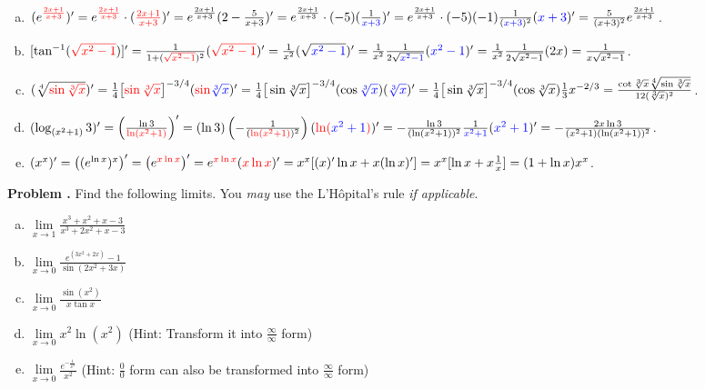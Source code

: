 \documentclass[11pt,letterpaper]{article}
\newcounter{problem}
\newcommand{\problem}{
	\stepcounter{problem}%
	\noindent \textbf{Problem \theproblem. }%
}
\begin{document}
\begin{enumerate}[(a)]
    \item $(e^{\textcolor{red}{\frac{2x+1}{x+3}}})' = e^{\textcolor{red}{\frac{2x+1}{x+3}}}\cdot(\textcolor{red}{\frac{2x+1}{x+3}})' = e^{\frac{2x+1}{x+3}}(2-\frac{5}{x+3})' = e^{\frac{2x+1}{x+3}}\cdot(-5)(\frac{1}{\textcolor{blue}{x+3}})' = e^{\frac{2x+1}{x+3}}\cdot(-5)(-1)\frac{1}{(\textcolor{blue}{x+3})^2}(\textcolor{blue}{x+3})' = \frac{5}{(x+3)^2}e^{\frac{2x+1}{x+3}}$.
    \item $[\tan^{-1}(\textcolor{red}{\sqrt{x^2-1}})]' = \frac{1}{1+(\textcolor{red}{\sqrt{x^2-1}})^2}(\textcolor{red}{\sqrt{x^2-1}})' = \frac{1}{x^2}(\sqrt{\textcolor{blue}{x^2-1}})' = \frac{1}{x^2}\frac{1}{2\sqrt{\textcolor{blue}{x^2-1}}}(\textcolor{blue}{x^2-1})' = \frac{1}{x^2}\frac{1}{2\sqrt{x^2-1}}(2x) = \frac{1}{x\sqrt{x^2-1}}$.
    \item $(\sqrt[4]{\textcolor{red}{\sin\sqrt[3]{x}}})'=\frac{1}{4}\big[\textcolor{red}{\sin\sqrt[3]{x}}\big]^{-3/4}(\textcolor{red}{\sin}\textcolor{blue}{\sqrt[3]{x}})' = \frac{1}{4}\big[\sin\sqrt[3]{x}\big]^{-3/4}(\cos\textcolor{blue}{\sqrt[3]{x}})(\textcolor{blue}{\sqrt[3]{x}})'=\frac{1}{4}\big[\sin\sqrt[3]{x}\big]^{-3/4}(\cos\sqrt[3]{x})\frac{1}{3}x^{-2/3} = \frac{\cot \sqrt[3]{x}\sqrt[4]{\sin\sqrt[3]{x}}}{12(\sqrt[3]{x})^2}$.
    \item $(\log_{(x^2+1)} 3)'= \left(\frac{\ln 3}{\textcolor{red}{\ln (x^2+1)}}\right)' = (\ln 3)\left(-\frac{1}{(\textcolor{red}{\ln(x^2+1)})^2}\right)(\textcolor{red}{\ln(}\textcolor{blue}{x^2+1}\textcolor{red}{)})' = -\frac{\ln 3}{(\ln(x^2+1))^2}\frac{1}{\textcolor{blue}{x^2+1}}(\textcolor{blue}{x^2+1})' = -\frac{2x\ln 3}{(x^2+1)(\ln(x^2+1))^2}$.
    \item $(x^x)' = \left((e^{\ln x})^x\right)' = \left(e^{\textcolor{red}{x\ln x}}\right)' = e^{\textcolor{red}{x\ln x}} (\textcolor{red}{x\ln x})' = x^x [(x)'\ln x + x (\ln x)'] = x^x [\ln x + x \frac{1}{x}] = (1+ \ln x)x^x$.
\end{enumerate}\vspace{4mm}

\problem Find the following limits. You \textit{may} use the L'Hôpital's rule \textit{if applicable}.
\begin{enumerate}[(a)]
    \item $\lim\limits_{x \to 1} \frac{x^3+x^2+x-3}{x^3+2x^2+x-3}$
    \item $\lim\limits_{x \to 0} \frac{e^{(3x^2+2x)}-1}{\sin(2x^2+3x)}$
    \item $\lim\limits_{x \to 0} \frac{\sin (x^2)}{x \tan x}$
    \item $\lim\limits_{x \to 0} x^2 \ln (x^2)$ \quad (Hint: Transform it into $\frac{\infty}{\infty}$ form)
    \item $\lim\limits_{x \to 0} \frac{e^{-\frac{1}{x^2}}}{x^2}$ \quad (Hint: $\frac{0}{0}$ form can also be transformed into $\frac{\infty}{\infty}$ form)
\end{enumerate}\vspace{4mm}
\end{document}

